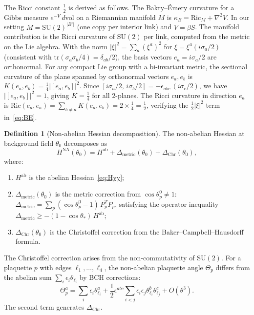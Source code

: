 \documentclass[11pt]{article}
\theoremstyle{definition}
\newtheorem{definition}[theorem]{Definition}
\newcommand{\SU}{\mathrm{SU}}
\newcommand{\tr}{\mathrm{tr}}
\begin{document}
The Ricci constant $\frac{1}{2}$ is derived as follows.
The Bakry--\'Emery curvature for a Gibbs measure
$e^{-V}\,d\mathrm{vol}$ on a Riemannian manifold $M$ is
$\kappa_B=\mathrm{Ric}_M+\nabla^2 V$.  In our setting $M=\SU(2)^{|B^\circ|}$
(one copy per interior link) and $V=\beta S$.  The manifold
contribution is the Ricci curvature of $\SU(2)$ per link, computed
from the metric on the Lie algebra.
With the norm $|\xi|^2=\sum_a(\xi^a)^2$ for $\xi=\xi^a(i\sigma_a/2)$
(consistent with $\tr(\sigma_a\sigma_b/4)=\delta_{ab}/2$), the basis
vectors $e_a=i\sigma_a/2$ are orthonormal.  For any compact Lie group
with a bi-invariant metric, the sectional curvature of the plane
spanned by orthonormal vectors $e_a,e_b$ is
$K(e_a,e_b)=\frac{1}{4}|[e_a,e_b]|^2$.  Since
$[i\sigma_a/2,\,i\sigma_b/2]=-\epsilon_{abc}\,(i\sigma_c/2)$,
we have $|[e_a,e_b]|^2=1$, giving $K=\frac{1}{4}$ for all 2-planes.
The Ricci curvature in direction $e_a$ is
$\mathrm{Ric}(e_a,e_a)=\sum_{b\ne a}K(e_a,e_b)
=2\times\frac{1}{4}=\frac{1}{2}$,
verifying the $\frac{1}{2}|\xi|^2$ term in~\eqref{eq:BE}.

\begin{definition}[Non-abelian Hessian decomposition]\label{def:NAhess}
The non-abelian Hessian at background field $\theta_0$ decomposes as
\begin{equation}\label{eq:NAdecomp}
H^{\mathrm{NA}}(\theta_0)
=H^{\mathrm{ab}}+\Delta_{\mathrm{metric}}(\theta_0)
+\Delta_{\mathrm{Chr}}(\theta_0),
\end{equation}
where:
\begin{enumerate}[nosep,label=(\roman*)]
\item $H^{\mathrm{ab}}$ is the abelian Hessian~\eqref{eq:Hyy};
\item $\Delta_{\mathrm{metric}}(\theta_0)$ is the metric correction
from $\cos\theta_p^0\ne 1$: $\Delta_{\mathrm{metric}}
=\sum_p(\cos\theta_p^0-1)\,P_p^T P_p$, satisfying the operator
inequality $\Delta_{\mathrm{metric}}\ge-(1-\cos\theta_*)\,H^{\mathrm{ab}}$;
\item $\Delta_{\mathrm{Chr}}(\theta_0)$ is the Christoffel correction
from the Baker--Campbell--Hausdorff formula.
\end{enumerate}
\end{definition}

The Christoffel correction arises from the non-commutativity of
$\SU(2)$.  For a plaquette $p$ with edges $\ell_1,\ldots,\ell_4$,
the non-abelian plaquette angle $\Theta_p$ differs from the abelian
sum $\sum_i\epsilon_i\theta_{\ell_i}$ by BCH corrections:
\begin{equation}\label{eq:BCH}
\Theta_p^a=\sum_i\epsilon_i\theta_{\ell_i}^a
+\frac{1}{2}\epsilon^{abc}\sum_{i<j}\epsilon_i\epsilon_j
\theta_{\ell_i}^b\theta_{\ell_j}^c+O(\theta^3).
\end{equation}
The second term generates $\Delta_{\mathrm{Chr}}$.
\end{document}
